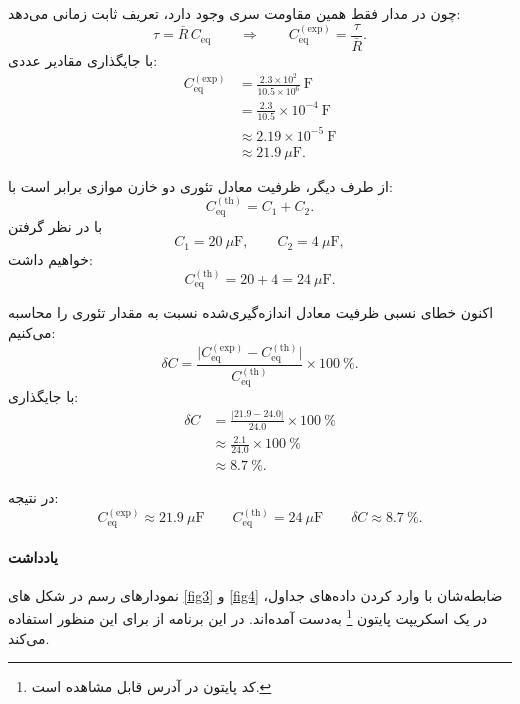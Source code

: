 \documentclass[a4paper, 11pt]{article}
\begin{document}
چون در مدار فقط همین مقاومت سری وجود دارد، تعریف ثابت زمانی می‌دهد:
\begin{equation}
\tau = \bar{R}\,C_{\mathrm{eq}}
\qquad\Rightarrow\qquad
C_{\mathrm{eq}}^{(\mathrm{exp})} = \frac{\tau}{\bar{R}}.
\end{equation}
با جایگذاری مقادیر عددی:
\begin{align}
C_{\mathrm{eq}}^{(\mathrm{exp})}
&= \frac{2.3\times 10^{2}}{10.5\times 10^{6}}~\mathrm{F} \\[1mm]
&= \frac{2.3}{10.5}\times 10^{-4}~\mathrm{F} \\[1mm]
&\approx 2.19\times 10^{-5}~\mathrm{F} \\[1mm]
&\approx 21.9~\mu\mathrm{F}.
\end{align}

از طرف دیگر، ظرفیت معادل تئوری دو خازن موازی برابر است با:
\begin{equation}
C_{\mathrm{eq}}^{(\mathrm{th})} = C_1 + C_2.
\end{equation}
با در نظر گرفتن
\[
C_1 = 20~\mu\mathrm{F}, \qquad C_2 = 4~\mu\mathrm{F},
\]
خواهیم داشت:
\begin{equation}
C_{\mathrm{eq}}^{(\mathrm{th})} = 20 + 4 = 24~\mu\mathrm{F}.
\end{equation}

اکنون خطای نسبی ظرفیت معادل اندازه‌گیری‌شده نسبت به مقدار تئوری را محاسبه می‌کنیم:
\begin{equation}
\delta C = \frac{\bigl|C_{\mathrm{eq}}^{(\mathrm{exp})}
             - C_{\mathrm{eq}}^{(\mathrm{th})}\bigr|}
            {C_{\mathrm{eq}}^{(\mathrm{th})}} \times 100~\%.
\end{equation}
با جایگذاری:
\begin{align}
\delta C
&= \frac{|21.9 - 24.0|}{24.0}\times 100~\% \\[1mm]
&\approx \frac{2.1}{24.0}\times 100~\% \\[1mm]
&\approx 8.7~\%.
\end{align}

در نتیجه:
\begin{equation}
\boxed{C_{\mathrm{eq}}^{(\mathrm{exp})} \approx 21.9~\mu\mathrm{F}}
\qquad
\boxed{C_{\mathrm{eq}}^{(\mathrm{th})} = 24~\mu\mathrm{F}}
\qquad
\boxed{\delta C \approx 8.7~\%.}
\end{equation}

\paragraph{یادداشت}
نمودار‌های رسم در شکل های \ref{fig3} و \ref{fig4} ضابطه‌شان با وارد کردن داده‌های جداول، در یک اسکریپت پایتون \footnote{کد پایتون در آدرس  قابل مشاهده است.} به‌دست آمده‌اند. در این برنامه از  برای این منظور استفاده می‌کند.
\end{document}
